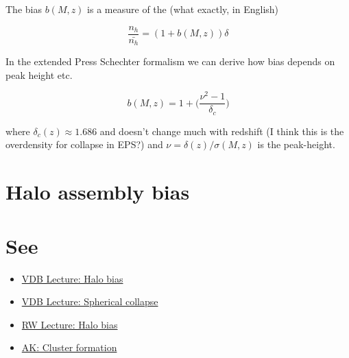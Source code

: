 \documentclass{article}
\begin{document}
The bias $b(M, z)$ is a measure of the (what exactly, in English)

\begin{equation}
    \frac{n_h}{\bar{n_h}} = (1 + b(M, z)) \delta
\end{equation}

In the extended Press Schechter formalism we can derive how bias depends on peak height etc.

\begin{equation}
    b(M, z) = 1 + \bigg(\frac{\nu^2 - 1}{\delta_c}\bigg)
\end{equation}

where $\delta_c(z) \approx 1.686$ and doesn't change much with redshift (I think this is the overdensity for collapse in EPS?) and $\nu = \delta(z) / \sigma(M, z)$ is the peak-height.

\section{Halo assembly bias}



\section{See}

\begin{itemize}
    \item \href{http://www.astro.yale.edu/vdbosch/astro610_lecture10.pdf}{VDB Lecture: Halo bias}
    \item \href{http://www.astro.yale.edu/vdbosch/astro610_lecture8.pdf}{VDB Lecture: Spherical collapse}
    \item \href{http://risa.stanford.edu/teaching/463/Lecture8.463.pdf}{RW Lecture: Halo bias}
    \item \href{https://ned.ipac.caltech.edu/level5/Sept12/Kravtsov/Kravtsov3.html}{AK: Cluster formation}
\end{itemize}
\end{document}
